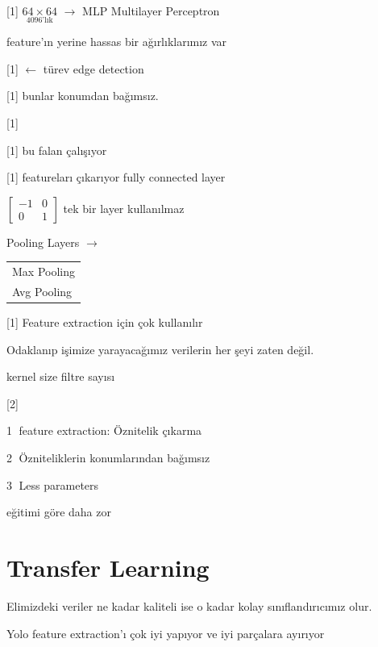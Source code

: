 \documentclass[11pt,a4paper]{article}
\begin{document}

[1]
$\underset{\text{4096'lık}}{64\times 64}$ $\rightarrow$ MLP Multilayer Perceptron

\textcolor{turuncukalem}{feature'ın yerine hassas bir ağırlıklarımız var}

[1]
$\leftarrow$ türev edge detection

[1]
bunlar konumdan bağımsız.

[1]

[1]
bu  falan çalışıyor

[1]
featureları çıkarıyor \hfill fully connected layer

$\begin{bmatrix} -1 & 0 \\ 0 & 1 \end{bmatrix}$ \quad tek bir layer kullanılmaz

Pooling Layers $\rightarrow$ \begin{tabular}[c]{@{}l@{}}Max Pooling\\ Avg Pooling\end{tabular}

[1]
Feature extraction için çok kullanılır

Odaklanıp işimize yarayacağımız verilerin her şeyi zaten değil.

kernel size \quad filtre sayısı

[2]

\textcircled{1} feature extraction: Öznitelik çıkarma

\textcircled{2} Özniteliklerin konumlarından bağımsız

\textcircled{3} Less parameters

eğitimi  göre daha zor

\section{Transfer Learning}
Elimizdeki veriler ne kadar kaliteli ise o kadar kolay sınıflandırıcımız olur.

Yolo feature extraction'ı çok iyi yapıyor ve iyi parçalara ayırıyor
\end{document}
